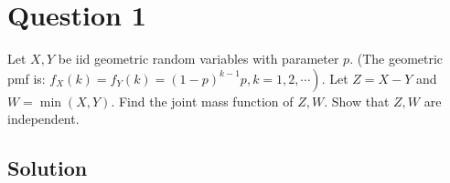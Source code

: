 \section*{Question 1}

Let \( X, Y \) be iid geometric random variables with parameter \( p \).
(The geometric pmf is: \( \left.f_{X}(k)=f_{Y}(k)=(1-p)^{k-1} p, k=1,2, \cdots\right) \).
Let \( Z=X-Y \) and \( W=\min (X, Y) \).
Find the joint mass function of \( Z, W \).
Show that \( Z, W \) are independent.

\subsection*{Solution}
